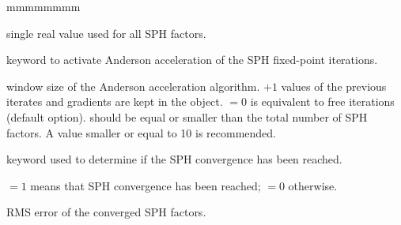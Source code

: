 \begin{ListeDeDescription}{mmmmmmmm}
\item[\dusa{varmax}] single real value used for all SPH factors.

\item[\moc{ANDERSON}] keyword to activate Anderson acceleration of the SPH fixed-point iterations.

\item[\dusa{m}] window size of the Anderson acceleration algorithm. $+1$ values of the previous iterates and gradients are kept
in the  object.  $=0$ is equivalent to free iterations (default option).  should be equal or smaller than
the total number of SPH factors. A value smaller or equal to 10 is recommended.

\item[\moc{OUT-CONV-TST}] keyword used to determine if the SPH convergence has been reached.

\item[\dusa{$l_{conv}$}] $=1$ means that SPH convergence has been reached; $=0$ otherwise.

\item[\dusa{$rms_{conv}$}] RMS error of the converged SPH factors.

\end{ListeDeDescription}
\clearpage
